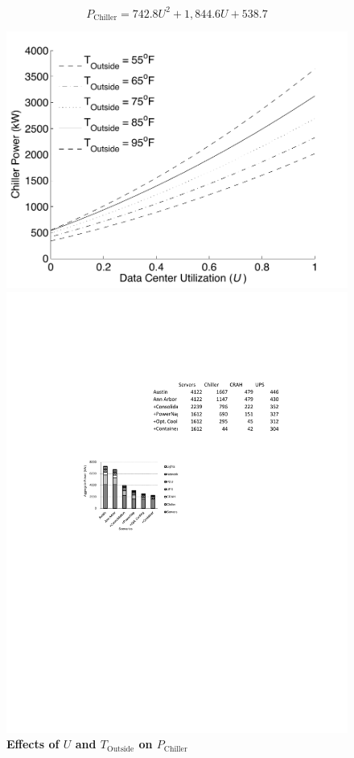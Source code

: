 $$P_{\mathrm{Chiller}} = 742.8 U^{2} + 1,\!844.6 U + 538.7$$

\begin{figure}[ht]
\begin{minipage}[b]{0.5\linewidth}
\centering
    \includegraphics[width = \linewidth]{Appendices/WEED/figure/ChillerLoadvaryOutside.pdf}
  \caption{\textbf{ Effects of $U$ and $T_{\mathrm{Outside}}$ on $P_{\mathrm{Chiller}}$ } }
  \label{figure::ChillerB}
  \end{minipage}
  \hspace{0.5cm}
  \begin{minipage}[b]{0.5\linewidth}
\centering
    \includegraphics[width = \linewidth]{Appendices/WEED/figure/comparison.pdf}

\end{minipage}
\end{figure}
